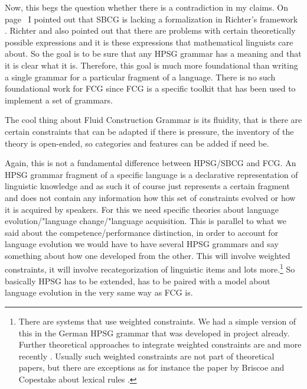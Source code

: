 Now, this begs the question whether there is a contradiction in my claims. On
page~\pageref{page-sbcg-formalization} I pointed out that SBCG is lacking a formalization in
Richter's framework \citep{Richter2004a-u}. Richter and also \citet{LM2006a} pointed out that there are problems with
certain theoretically possible expressions and it is these expressions that mathematical linguists care
about. So the goal is to be sure that any HPSG grammar has a meaning and that it is clear what it
is. Therefore, this goal is much more foundational than writing a single grammar for a particular fragment
of a language. There is no such foundational work for FCG since FCG is a specific toolkit that has been used
to implement a set of grammars.


The cool thing about Fluid Construction Grammar is its fluidity, that is there are certain
constraints that can be adapted if there is pressure, the inventory of the theory is open-ended, so
categories and features can be added if need be.

Again, this is not a fundamental difference between HPSG/SBCG and FCG. An HPSG grammar fragment of a
specific language is a declarative representation of linguistic knowledge and as such it of course
just represents a certain fragment and does not contain any information how this set of constraints
evolved or how it is acquired by speakers. For this we need specific theories about language
evolution/"language change/"language acquisition. This is parallel to what we said about the
competence/performance distinction, in order to account for language evolution we would have to have
several HPSG grammars and say something about how one developed from the other. This will involve
weighted constraints, it will involve recategorization of linguistic items and lots more.\footnote{
  There are systems that use weighted constraints. We had a simple version of this in the
  German HPSG grammar that was developed in \verbmobil project \citep{MK2000a} already. Further
  theoretical approaches to integrate weighted constraints are  and more recently
  . Usually such weighted constraints are not part of theoretical papers,
  but there are exceptions as for instance the paper by Briscoe and Copestake about lexical rules \citep{BC99a}.
} So basically HPSG has to be extended, has to be paired with a model about
language evolution in the very same way as FCG is.



